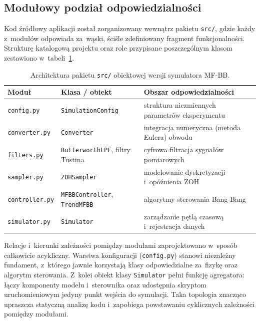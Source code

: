 \subsection{Modułowy podział odpowiedzialności}
\label{subsec:moduly}

Kod źródłowy aplikacji został zorganizowany wewnątrz pakietu \texttt{src/}, gdzie każdy z~modułów odpowiada za~wąski, ściśle zdefiniowany fragment funkcjonalności. Strukturę katalogową projektu oraz role przypisane poszczególnym klasom zestawiono w~tabeli~\ref{tab:moduly}.

\begin{table}[ht]
    \centering
    \caption{Architektura pakietu \texttt{src/} obiektowej wersji symulatora MF-BB.}
    \label{tab:moduly}
    \begin{tabular}{lll}
        \toprule
        \textbf{Moduł} & \textbf{Klasa / obiekt} & \textbf{Obszar odpowiedzialności} \\
        \midrule
        \texttt{config.py}     & \texttt{SimulationConfig}  & struktura niezmiennych parametrów eksperymentu \\
        \texttt{converter.py}  & \texttt{Converter}         & integracja numeryczna (metoda Eulera) obwodu \\
        \texttt{filters.py}    & \texttt{ButterworthLPF}, filtry Tustina & cyfrowa filtracja sygnałów pomiarowych \\
        \texttt{sampler.py}    & \texttt{ZOHSampler}        & modelowanie dyskretyzacji i~opóźnienia ZOH \\
        \texttt{controller.py} & \texttt{MFBBController}, \texttt{TrendMFBB} & algorytmy sterowania Bang-Bang \\
        \texttt{simulator.py}  & \texttt{Simulator}         & zarządzanie pętlą czasową i~rejestracja danych \\
        \bottomrule
    \end{tabular}
\end{table}

Relacje i~kierunki zależności pomiędzy modułami zaprojektowano w~sposób całkowicie acykliczny. Warstwa konfiguracji (\texttt{config.py}) stanowi niezależny fundament, z~którego jawnie korzystają klasy odpowiedzialne za~fizykę oraz algorytm sterowania. Z~kolei obiekt klasy \texttt{Simulator} pełni funkcję agregatora: łączy komponenty modelu i~sterownika oraz udostępnia skryptom uruchomieniowym jedyny punkt wejścia do symulacji. Taka topologia znacząco upraszcza statyczną analizę kodu i~zapobiega powstawaniu cyklicznych zależności pomiędzy modułami.

